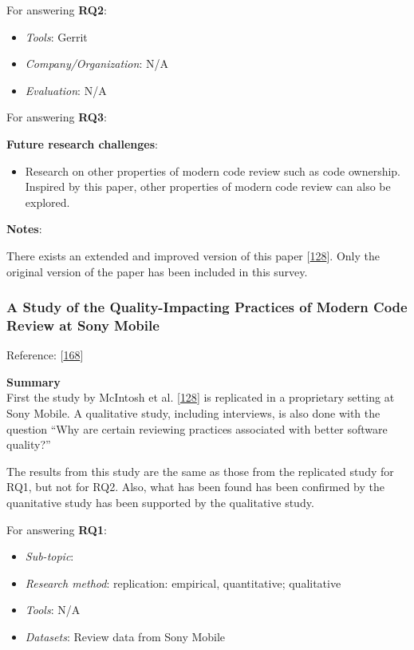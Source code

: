 \documentclass[]{book}
\providecommand{\tightlist}{%
  \setlength{\itemsep}{0pt}\setlength{\parskip}{0pt}}
\begin{document}
For answering \textbf{RQ2}:

\begin{itemize}
\tightlist
\item
  \emph{Tools}: Gerrit
\item
  \emph{Company/Organization}: N/A
\item
  \emph{Evaluation}: N/A
\end{itemize}

For answering \textbf{RQ3}:

\textbf{Future research challenges}:

\begin{itemize}
\tightlist
\item
  Research on other properties of modern code review such as code
  ownership. Inspired by this paper, other properties of modern code
  review can also be explored.
\end{itemize}

\textbf{Notes}:

There exists an extended and improved version of this paper
{[}\protect\hyperlink{ref-mcintosh2016empirical}{128}{]}. Only the
original version of the paper has been included in this survey.

\subsubsection{A Study of the Quality-Impacting Practices of Modern Code
Review at Sony
Mobile}\label{a-study-of-the-quality-impacting-practices-of-modern-code-review-at-sony-mobile}

Reference: {[}\protect\hyperlink{ref-shimagaki2016study}{168}{]}

\textbf{Summary}\\
First the study by McIntosh et al.
{[}\protect\hyperlink{ref-mcintosh2016empirical}{128}{]} is replicated
in a proprietary setting at Sony Mobile. A qualitative study, including
interviews, is also done with the question ``Why are certain reviewing
practices associated with better software quality?''

The results from this study are the same as those from the replicated
study for RQ1, but not for RQ2. Also, what has been found has been
confirmed by the quanitative study has been supported by the qualitative
study.

For answering \textbf{RQ1}:

\begin{itemize}
\tightlist
\item
  \emph{Sub-topic}:
\item
  \emph{Research method}: replication: empirical, quantitative;
  qualitative
\item
  \emph{Tools}: N/A
\item
  \emph{Datasets}: Review data from Sony Mobile
\end{itemize}
\end{document}
